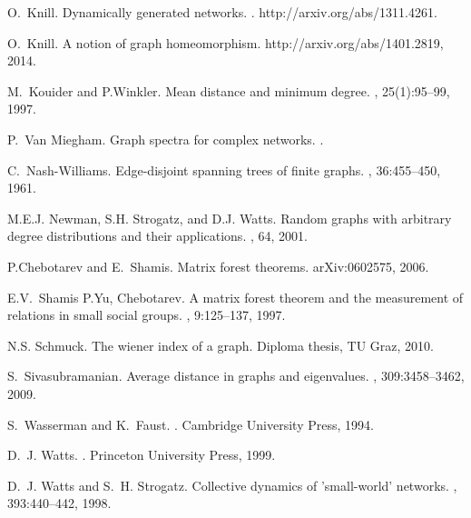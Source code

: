 \documentclass[12pt]{amsart}
\theoremstyle{definition}
\begin{document}
\begin{thebibliography}{10}
O.~Knill.
\newblock Dynamically generated networks.
.
\newblock http://arxiv.org/abs/1311.4261.

O.~Knill.
\newblock A notion of graph homeomorphism.
\newblock http://arxiv.org/abs/1401.2819, 2014.

M.~Kouider and P.Winkler.
\newblock Mean distance and minimum degree.
, 25(1):95--99, 1997.

P.~Van Miegham.
\newblock Graph spectra for complex networks.
.

C.~Nash-Williams.
\newblock Edge-disjoint spanning trees of finite graphs.
, 36:455--450, 1961.

M.E.J. Newman, S.H. Strogatz, and D.J. Watts.
\newblock Random graphs with arbitrary degree distributions and their
  applications.
, 64, 2001.

P.Chebotarev and E.~Shamis.
\newblock Matrix forest theorems.
\newblock arXiv:0602575, 2006.

E.V.~Shamis P.Yu, Chebotarev.
\newblock A matrix forest theorem and the measurement of relations in small
  social groups.
, 9:125--137, 1997.

N.S. Schmuck.
\newblock The wiener index of a graph.
\newblock Diploma thesis, TU Graz, 2010.

S.~Sivasubramanian.
\newblock Average distance in graphs and eigenvalues.
, 309:3458--3462, 2009.

S.~Wasserman and K.~Faust.
.
\newblock Cambridge University Press, 1994.

D.~J. Watts.
.
\newblock Princeton University Press, 1999.

D.~J. Watts and S.~H. Strogatz.
\newblock Collective dynamics of 'small-world' networks.
, 393:440--442, 1998.

\end{thebibliography}
\end{document}
